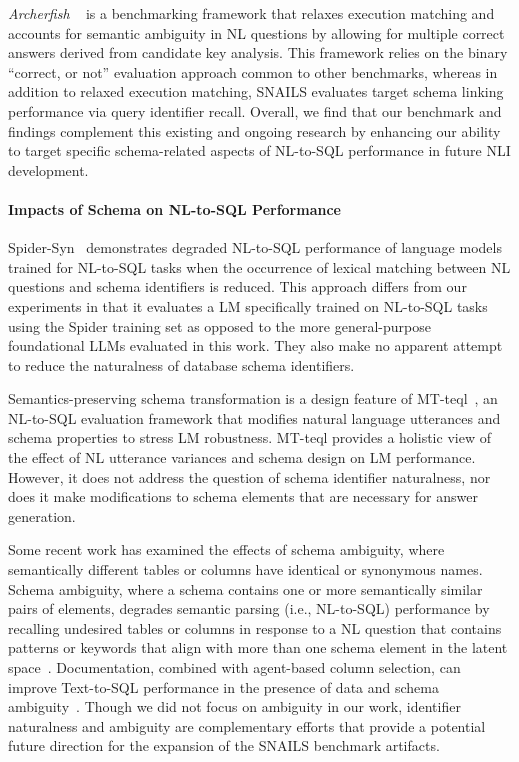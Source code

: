 \emph{Archerfish}
~\cite{floratou2024nl2sql} is a benchmarking framework that relaxes execution matching and accounts for semantic ambiguity in NL questions by allowing for multiple correct answers derived from candidate key analysis.
This framework relies on the binary ``correct, or not'' evaluation approach common to other benchmarks, whereas in addition to relaxed execution matching, SNAILS evaluates target schema linking performance via query identifier recall.
Overall, we find that our benchmark and findings complement this existing and ongoing research by enhancing our ability to target specific schema-related aspects of NL-to-SQL performance in future NLI development.

\paragraph{\textbf{Impacts of Schema on NL-to-SQL Performance}}
Spider-Syn~\cite{gan-etal-2021-towards} demonstrates degraded NL-to-SQL performance of language models trained for NL-to-SQL tasks when the occurrence of lexical matching between NL questions and schema identifiers is reduced. 
This approach differs from our experiments in that it evaluates a LM specifically trained on NL-to-SQL tasks using the Spider training set as opposed to the more general-purpose foundational LLMs evaluated in this work.
They also make no apparent attempt to reduce the naturalness of  database schema identifiers.

Semantics-preserving schema transformation is a design feature of MT-teql~\cite{10.14778/3494124.3494139}, an NL-to-SQL evaluation framework that modifies natural language utterances and schema properties to stress LM robustness.
MT-teql provides a holistic view of the effect of NL utterance variances and schema design on LM performance. 
However, it does not address the question of schema identifier naturalness, nor does it make modifications to schema elements that are necessary for answer generation. 

Some recent work has examined the effects of schema ambiguity, where semantically different tables or columns have identical or synonymous names.
Schema ambiguity, where a schema contains one or more semantically similar pairs of elements, degrades semantic parsing (i.e., NL-to-SQL) performance by recalling undesired tables or columns in response to a NL question that contains patterns or keywords that align with more than one schema element in the latent space~\cite{10555063}.
Documentation, combined with agent-based column selection, can improve Text-to-SQL performance in the presence of data and schema ambiguity~\cite{huang2023data}.
Though we did not focus on ambiguity in our work, identifier naturalness and ambiguity are complementary efforts that provide a potential future direction for the expansion of the SNAILS benchmark artifacts. 



